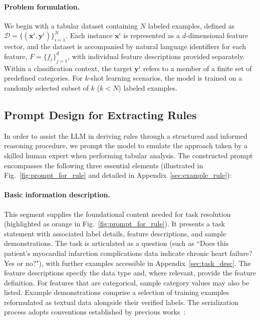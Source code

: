 \vspace*{-0.12in}
\paragraph{Problem formulation.} We begin with a tabular dataset containing $N$ labeled examples, defined as $\mathcal{D} = \{(\mathbf{x}^i, \mathbf{y}^i)\}_{i=1}^{N}$. Each instance $\mathbf{x}^i$ is represented as a $d$-dimensional feature vector, and the dataset is accompanied by natural language identifiers for each feature, $F = \{f_j\}_{j=1}^{d}$, with individual feature descriptions provided separately. Within a classification context, the target $\mathbf{y}^i$ refers to a member of a finite set of predefined categories. For $k$-shot learning scenarios, the model is trained on a randomly selected subset of $k$ ($k < N$) labeled examples.

\subsection{Prompt Design for Extracting Rules}
\label{Sec:prompt_design}
In order to assist the LLM in deriving rules through a structured and informed reasoning procedure, we prompt the model to emulate the approach taken by a skilled human expert when performing tabular analysis. The constructed prompt encompasses the following three essential elements (illustrated in Fig.~\ref{fig:prompt_for_rule} and detailed in Appendix~\ref{sec:example_rule}):

\vspace*{-0.12in}
\paragraph{Basic information description.} This segment supplies the foundational content needed for task resolution (highlighted as orange in Fig.~\ref{fig:prompt_for_rule}). It presents a task statement with associated label details, feature descriptions, and sample demonstrations. The task is articulated as a question (such as ``Does this patient's myocardial infarction complications data indicate chronic heart failure? Yes or no?"), with further examples accessible in Appendix~\ref{sec:task_desc}. The feature descriptions specify the data type and, where relevant, provide the feature definition. For features that are categorical, sample category values may also be listed. Example demonstrations comprise a selection of training examples reformulated as textual data alongside their verified labels. The serialization process adopts conventions established by previous works~\cite{dinh2022lift,hegselmann2023tabllm}:

